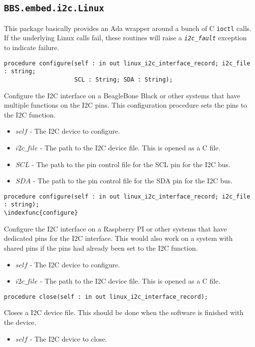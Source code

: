 \documentclass[10pt, openany]{book}
\newcommand{\indexfunc}[1]{\index[func]{#1}}
\newcommand{\package}[1]{\texttt{#1}}
\newcommand{\function}[1]{\texttt{#1}}
\newcommand{\constant}[1]{\emph{\texttt{#1}}}
\begin{document}
\subsection{\package{BBS.embed.i2c.Linux}}
This package basically provides an Ada wrapper around a bunch of C \function{ioctl} calls.  If the underlying Linux calls fail, these routines will raise a \constant{i2c\_fault} exception to indicate failure.
\begin{lstlisting}
procedure configure(self : in out linux_i2c_interface_record; i2c_file : string;
                    SCL : String; SDA : String);
\end{lstlisting}
\indexfunc{configure}
Configure the I2C interface on a BeagleBone Black or other systems that have multiple functions on the I2C pins.  This configuration procedure sets the pins to the I2C function.
\begin{itemize}
  \item $self$ - The I2C device to configure.
  \item $i2c\_file$ - The path to the I2C device file.  This is opened as a C file.
  \item $SCL$ - The path to the pin control file for the SCL pin for the I2C bus.
  \item $SDA$ - The path to the pin control file for the SDA pin for the I2C bus.
\end{itemize}

\begin{lstlisting}
procedure configure(self : in out linux_i2c_interface_record; i2c_file : string);
\indexfunc{configure}
\end{lstlisting}
Configure the I2C interface on a Raspberry PI or other systems that have dedicated pins for the I2C interface.  This would also work on a system with shared pins if the pins had already been set to the I2C function.
\begin{itemize}
  \item $self$ - The I2C device to configure.
  \item $i2c\_file$ - The path to the I2C device file.  This is opened as a C file.
\end{itemize}

\begin{lstlisting}
procedure close(self : in out linux_i2c_interface_record);
\end{lstlisting}
\indexfunc{close}
Closes a I2C device file.  This should be done when the software is finished with the device.
\begin{itemize}
  \item $self$ - The I2C device to close.
\end{itemize}
\end{document}
